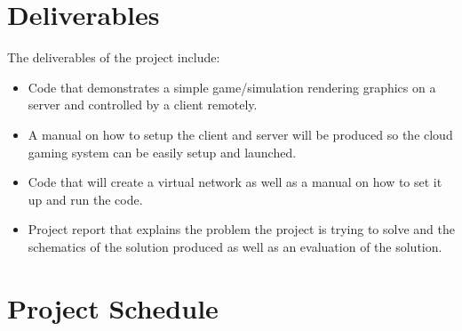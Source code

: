 \section{Deliverables}
The deliverables of the project include:
\begin{itemize}
  \item Code that demonstrates a simple game/simulation rendering graphics on a server and controlled by a client remotely.
  \item A manual on how to setup the client and server will be produced so the cloud gaming system can be easily setup and launched. 
  \item Code that will create a virtual network as well as a manual on how to set it up and run the code.
  \item Project report that explains the problem the project is trying to solve and the schematics of the solution produced as well as an evaluation of the solution.
\end{itemize}

\section{Project Schedule}
\lipsum[1-1]